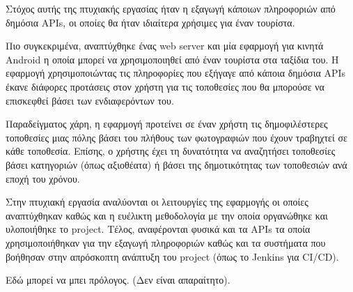 \documentclass[oneside, 12pt]{book}
\begin{document}
\Titlepage
\Declarationpage
\begin{Abstract}
Στόχος αυτής της πτυχιακής εργασίας ήταν η εξαγωγή κάποιων πληροφοριών από δημόσια APIs, οι οποίες θα ήταν ιδιαίτερα χρήσιμες για έναν τουρίστα. 

Πιο συγκεκριμένα, αναπτύχθηκε ένας web server και μία εφαρμογή για κινητά Android η οποία μπορεί να χρησιμοποιηθεί από έναν τουρίστα στα ταξίδια του. Η εφαρμογή χρησιμοποιώντας τις πληροφορίες που εξήγαγε από κάποια δημόσια APIs έκανε διάφορες προτάσεις στον χρήστη για τις τοποθεσίες που θα μπορούσε να επισκεφθεί βάσει των ενδιαφερόντων του.

Παραδείγματος χάρη, η εφαρμογή προτείνει σε έναν χρήστη τις δημοφιλέστερες τοποθεσίες μιας πόλης βάσει του πλήθους των φωτογραφιών που έχουν τραβηχτεί σε κάθε τοποθεσία. Επίσης, ο χρήστης έχει τη δυνατότητα να αναζητήσει τοποθεσίες βάσει κατηγοριών (όπως αξιοθέατα) ή βάσει της δημοτικότητας των τοποθεσιών ανά εποχή του χρόνου.

Στην πτυχιακή εργασία αναλύονται οι λειτουργίες της εφαρμογής οι οποίες αναπτύχθηκαν καθώς και η ευέλικτη μεθοδολογία με την οποία οργανώθηκε και υλοποιήθηκε το project. Τέλος, αναφέρονται φυσικά και τα APIs τα οποία χρησιμοποιήθηκαν για την εξαγωγή πληροφοριών καθώς και τα συστήματα που βοήθησαν στην απρόσκοπτη ανάπτυξη του project (όπως το Jenkins για CI/CD).
\end{Abstract}
\tableofcontents

\listoftables
\listoffigures

\begin{Preface}
Εδώ μπορεί να μπει πρόλογος. (Δεν είναι απαραίτητο).
\end{Preface}
\end{document}
